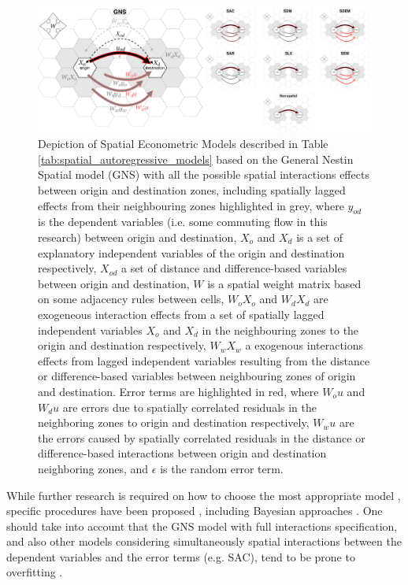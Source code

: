 \begin{figure}[ht!]
    \centering
    \includegraphics[width=1\textwidth]{diagram_interactions_H_nolabels.jpg}
    \caption{Depiction of Spatial Econometric Models described in Table~ \ref{tab:spatial_autoregressive_models} based on the General Nestin Spatial model (GNS) with all the possible spatial interactions effects between origin and destination zones, including spatially lagged effects from their neighbouring zones highlighted in grey, where $y_{od}$ is the dependent variables (i.e. some commuting flow in this research) between origin and destination, $X_o$ and $X_d$ is a set of explanatory independent variables of the origin and destination respectively, $X_{od}$ a set of distance and difference-based variables between origin and destination, $W$ is a spatial weight matrix based on some adjacency rules between cells, $W_o X_o$ and $W_d X_d$ are exogeneous interaction effects from a set of spatially lagged independent variables $X_o$ and $X_d$ in the neighbouring zones to the origin and destination respectively, $W_w X_w$ a exogenous interactions effects from lagged independent variables resulting from the distance or difference-based variables between neighbouring zones of origin and destination. Error terms are highlighted in red, where $W_o u$ and $W_d u$ are errors due to spatially correlated residuals in the neighboring zones to origin and destination respectively, $W_w u$ are the errors caused by spatially correlated residuals in the distance or difference-based interactions between origin and destination neighboring zones, and $\epsilon$ is the random error term.}
    \label{fig:diagram_interactions}
\end{figure}



While further research is required on how to choose the most appropriate model \citep{HalleckVega2015TheModel}, specific procedures have been proposed \citep{Elhorst2014SpatialEconometrics}, including Bayesian approaches \citep{LeSage2014SpatialApproach, LeSage2016AEffects}. One should take into account that the GNS model with full interactions specification, and also other models considering simultaneously spatial interactions between the dependent variables and the error terms (e.g. SAC), tend to be prone to overfitting \citep{Margaretic2017SpatialFlows}.

